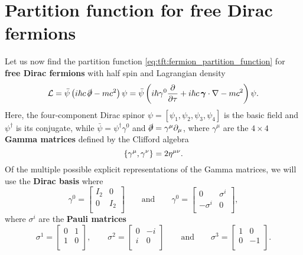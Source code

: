 \section{Partition function for free Dirac fermions}

Let us now find the partition function \eqref{eq:tft:fermion_partition_function} for \textbf{free Dirac fermions} with half spin and Lagrangian density
\begin{equation}
	\mathcal{L} = \bar\psi \left( i \hbar c \, \slashed\partial - m c^2 \right) \psi
	      = \bar\psi \left( i \hbar \gamma^0 \pdv{}{\tau} + i \hbar c \, {\bm{\gamma}} \cdot \nabla - m c^2 \right) \psi .
\label{eq:tft:dirac_lagrangian}
\end{equation}
Here, the four-component Dirac spinor $\psi = [ \psi_1, \psi_2, \psi_3, \psi_4] $ is the basic field and $\psi^\dagger$ is its conjugate, while $\bar\psi = \psi^\dagger \gamma^0$ and $\slashed\partial = \gamma^\mu \partial_\mu$, where $\gamma^\mu$ are the $4 \times 4$ \textbf{Gamma matrices} defined by the Clifford algebra
\begin{equation}
	\{ \gamma^\mu , \gamma^\nu \} = 2 \eta^{\mu \nu} .
\end{equation}
Of the multiple possible explicit representations of the Gamma matrices, we will use the \textbf{Dirac basis} where
\begin{equation}
	\gamma^0 = \begin{bmatrix} I_2 & 0 \\ 0 & I_2 \\ \end{bmatrix}
	\qquad \text{and} \qquad
	\gamma^0 = \begin{bmatrix} 0 & \sigma^i \\ -\sigma^i & 0 \\ \end{bmatrix} ,
\label{eq:tft:gamma_dirac_basis}
\end{equation}
where $\sigma^i$ are the \textbf{Pauli matrices}
\begin{equation}
	\sigma^1 = \begin{bmatrix} 0 & 1 \\ 1 & 0 \\ \end{bmatrix} ,
	\qquad
	\sigma^2 = \begin{bmatrix} 0 & -i \\ i & 0 \\ \end{bmatrix}
	\qquad \text{and} \qquad
	\sigma^3 = \begin{bmatrix} 1 & 0 \\ 0 & -1 \\ \end{bmatrix} .
\label{eq:tft:pauli_matrices}
\end{equation}


